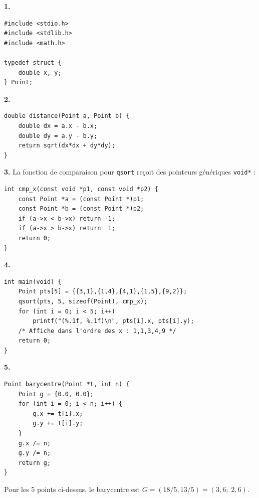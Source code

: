 \documentclass[12pt,a4paper]{article}
\begin{document}
\begin{boitecorrige}
\textbf{1.}
\begin{lstlisting}
#include <stdio.h>
#include <stdlib.h>
#include <math.h>

typedef struct {
    double x, y;
} Point;
\end{lstlisting}

\textbf{2.}
\begin{lstlisting}
double distance(Point a, Point b) {
    double dx = a.x - b.x;
    double dy = a.y - b.y;
    return sqrt(dx*dx + dy*dy);
}
\end{lstlisting}

\textbf{3.} La fonction de comparaison pour \texttt{qsort} reçoit des pointeurs génériques \texttt{void*} :
\begin{lstlisting}
int cmp_x(const void *p1, const void *p2) {
    const Point *a = (const Point *)p1;
    const Point *b = (const Point *)p2;
    if (a->x < b->x) return -1;
    if (a->x > b->x) return  1;
    return 0;
}
\end{lstlisting}

\textbf{4.}
\begin{lstlisting}
int main(void) {
    Point pts[5] = {{3,1},{1,4},{4,1},{1,5},{9,2}};
    qsort(pts, 5, sizeof(Point), cmp_x);
    for (int i = 0; i < 5; i++)
        printf("(%.1f, %.1f)\n", pts[i].x, pts[i].y);
    /* Affiche dans l'ordre des x : 1,1,3,4,9 */
    return 0;
}
\end{lstlisting}

\textbf{5.}
\begin{lstlisting}
Point barycentre(Point *t, int n) {
    Point g = {0.0, 0.0};
    for (int i = 0; i < n; i++) {
        g.x += t[i].x;
        g.y += t[i].y;
    }
    g.x /= n;
    g.y /= n;
    return g;
}
\end{lstlisting}
Pour les 5 points ci-dessus, le barycentre est $G=(18/5, 13/5)=(3{,}6;\;2{,}6)$.
\end{boitecorrige}

\ifdefined\inMainDoc\else
\end{document}
